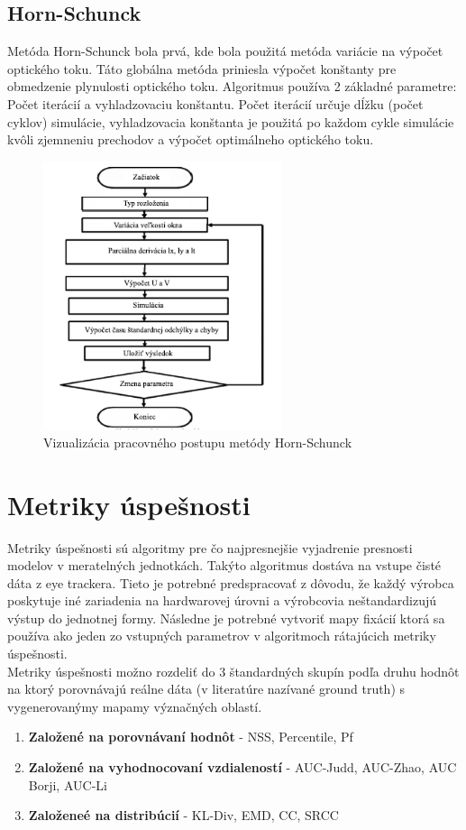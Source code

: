\subsection{Horn-Schunck}
Metóda Horn-Schunck bola prvá, kde bola použitá metóda variácie na výpočet optického toku.
Táto globálna metóda priniesla výpočet  konštanty pre obmedzenie plynulosti optického toku.
Algoritmus používa 2 základné parametre: Počet iterácií a vyhladzovaciu konštantu.
Počet iterácií určuje dĺžku (počet cyklov) simulácie, vyhladzovacia konštanta je použitá po každom cykle simulácie kvôli zjemneniu prechodov a výpočet optimálneho optického toku.

\begin{figure}[H]
  \centering
  \includegraphics[width=7cm]{pics/horn-schunck.png}
  \caption{Vizualizácia pracovného postupu metódy Horn-Schunck}
\end{figure}
\vspace{10mm}

\section{Metriky úspešnosti}
Metriky úspešnosti sú algoritmy pre čo najpresnejšie vyjadrenie presnosti modelov v meratelných jednotkách.
Takýto algoritmus dostáva na vstupe čisté dáta z eye trackera.
Tieto je potrebné predspracovať z dôvodu, že každý výrobca poskytuje iné zariadenia na hardwarovej úrovni a výrobcovia neštandardizujú výstup do jednotnej formy.
Následne je potrebné vytvoriť mapy fixácií ktorá sa používa ako jeden zo vstupných parametrov v algoritmoch rátajúcich metriky úspešnosti.
\\
Metriky úspešnosti možno rozdeliť do 3 štandardných skupín podľa druhu hodnôt na ktorý porovnávajú reálne dáta (v literatúre nazívané ground truth) s vygenerovanýmy mapamy význačných oblastí\cite{metrics-1}.
\begin{enumerate}
  \item\textbf{Založené na porovnávaní hodnôt} - NSS, Percentile, Pf
  \item\textbf{Založené na vyhodnocovaní vzdialeností} - AUC-Judd, AUC-Zhao, AUC Borji, AUC-Li
  \item\textbf{Založeneé na distribúcií} - KL-Div, EMD, CC, SRCC
\end{enumerate}

